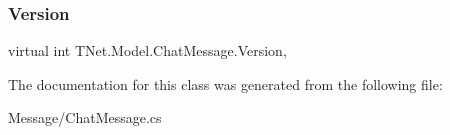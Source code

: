 \subsubsection{\texorpdfstring{Version}{Version}}
{\footnotesize\ttfamily virtual int T\+Net.\+Model.\+Chat\+Message.\+Version\hspace{0.3cm}{\ttfamily [get]}, {\ttfamily [set]}}







The documentation for this class was generated from the following file\+:\begin{DoxyCompactItemize}
\item 
Message/Chat\+Message.\+cs\end{DoxyCompactItemize}
